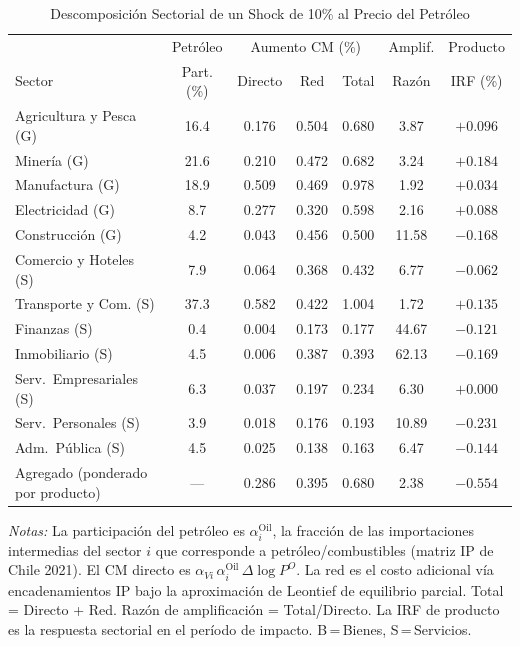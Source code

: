 \begin{table}[htbp]
\centering
\caption{Descomposición Sectorial de un Shock de 10\% al Precio del Petróleo}
\label{tab:oil_chiib0p01_decomp}
\begin{threeparttable}
\small
\begin{tabular}{@{}l c c c c c c@{}}
\toprule
 & Petróleo & \multicolumn{3}{c}{Aumento CM (\%)} & Amplif. & Producto \\
\cmidrule(lr){3-5}
Sector & Part. (\%) & Directo & Red & Total & Razón & IRF (\%) \\
\midrule
Agricultura y Pesca (G) & 16.4 & 0.176 & 0.504 & 0.680 &  3.87 & $+0.096$ \\
Minería (G) & 21.6 & 0.210 & 0.472 & 0.682 &  3.24 & $+0.184$ \\
Manufactura (G) & 18.9 & 0.509 & 0.469 & 0.978 &  1.92 & $+0.034$ \\
Electricidad (G) &  8.7 & 0.277 & 0.320 & 0.598 &  2.16 & $+0.088$ \\
Construcción (G) &  4.2 & 0.043 & 0.456 & 0.500 & 11.58 & $-0.168$ \\
Comercio y Hoteles (S) &  7.9 & 0.064 & 0.368 & 0.432 &  6.77 & $-0.062$ \\
Transporte y Com. (S) & 37.3 & 0.582 & 0.422 & 1.004 &  1.72 & $+0.135$ \\
Finanzas (S) &  0.4 & 0.004 & 0.173 & 0.177 & 44.67 & $-0.121$ \\
Inmobiliario (S) &  4.5 & 0.006 & 0.387 & 0.393 & 62.13 & $-0.169$ \\
Serv.\ Empresariales (S) &  6.3 & 0.037 & 0.197 & 0.234 &  6.30 & $+0.000$ \\
Serv.\ Personales (S) &  3.9 & 0.018 & 0.176 & 0.193 & 10.89 & $-0.231$ \\
Adm.\ Pública (S) &  4.5 & 0.025 & 0.138 & 0.163 &  6.47 & $-0.144$ \\
\midrule
Agregado (ponderado por producto) & --- & 0.286 & 0.395 & 0.680 &  2.38 & $-0.554$ \\
\bottomrule
\end{tabular}
\begin{tablenotes}[flushleft]
\footnotesize
\item \textit{Notas:} La participación del petróleo es $\alpha^{\text{Oil}}_i$, la fracción de las importaciones intermedias del sector $i$ que corresponde a petróleo/combustibles (matriz IP de Chile 2021). El CM directo es $\alpha_{Vi}\,\alpha^{\text{Oil}}_i\,\Delta\log P^O$. La red es el costo adicional vía encadenamientos IP bajo la aproximación de Leontief de equilibrio parcial. Total = Directo + Red. Razón de amplificación = Total/Directo. La IRF de producto es la respuesta sectorial en el período de impacto. B\,=\,Bienes, S\,=\,Servicios.
\end{tablenotes}
\end{threeparttable}
\end{table}
